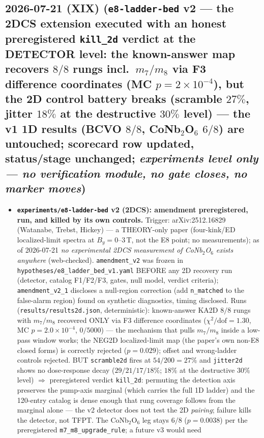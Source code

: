 \documentclass[11pt]{article}
\begin{document}
\subsection*{2026-07-21 (XIX) (\texttt{e8-ladder-bed} v2 --- the 2DCS extension executed with an honest preregistered \texttt{kill\_2d} verdict at the DETECTOR level: the known-answer map recovers $8/8$ rungs incl.\ $m_7/m_8$ via F3 difference coordinates (MC $p=2\times10^{-4}$), but the 2D control battery breaks (scramble $27\%$, jitter $18\%$ at the destructive $30\%$ level) --- the v1 1D results (BCVO $8/8$, CoNb$_2$O$_6$ $6/8$) are untouched; scorecard row updated, status/stage unchanged; \emph{experiments level only --- no verification module, no gate closes, no marker moves})}
\begin{itemize}[leftmargin=1.5em]
\item \textbf{\texttt{experiments/e8-ladder-bed} v2 (2DCS): amendment preregistered, run, and killed
by its own controls.} Trigger: arXiv:2512.16829 (Watanabe, Trebst, Hickey) --- a THEORY-only paper
(four-kink/ED localized-limit spectra at $B_y=0$--$3$\,T, not the E8 point; no measurements); as of
2026-07-21 \emph{no experimental 2DCS measurement of CoNb$_2$O$_6$ exists anywhere} (web-checked).
\texttt{amendment\_v2} was frozen in \texttt{hypotheses/e8\_ladder\_bed\_v1.yaml} BEFORE any 2D
recovery run (detector, catalog F1/F2/F3, gates, null model, verdict criteria);
\texttt{amendment\_v2\_1} discloses a null-region correction (add \texttt{n\_matched} to the
false-alarm region) found on synthetic diagnostics, timing disclosed. Runs
(\texttt{results/results2d.json}, deterministic): known-answer KA2D $8/8$ rungs with $m_7/m_8$
recovered ONLY via F3 difference coordinates ($\chi^2/\mathrm{dof}=1.30$, MC $p=2.0\times10^{-4}$,
$0/5000$) --- the mechanism that pulls $m_7/m_8$ inside a low-pass window works; the NEG2D
localized-limit map (the paper's own non-E8 closed forms) is correctly rejected ($p=0.029$); offset
and wrong-ladder controls rejected. BUT \texttt{scramble2d} fires at $54/200=27\%$ and
\texttt{jitter2d} shows no dose-response decay ($29/21/17/18\%$; $18\%$ at the destructive $30\%$
level) $\Rightarrow$ preregistered verdict \texttt{kill\_2d}: permuting the detection axis preserves
the pump-axis marginal (which carries the full 1D ladder) and the 120-entry catalog is dense enough
that rung coverage follows from the marginal alone --- the v2 detector does not test the 2D
\emph{pairing}; failure kills the detector, not TFPT. The CoNb$_2$O$_6$ leg stays $6/8$
($p=0.0038$) per the preregistered \texttt{m7\_m8\_upgrade\_rule}; a future v3 would need

\end{itemize}
\end{document}
